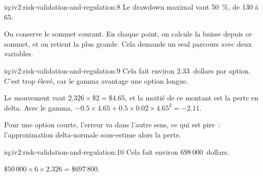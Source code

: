 \begin{solution}{iq:iv2:risk-validation-and-regulation:8}
Le drawdown maximal vaut 50~\%, de 130 à 65.

On conserve le sommet courant. En chaque point, on calcule la baisse depuis ce sommet, et on retient la plus grande. Cela demande un seul parcours avec deux variables.

\end{solution}

\begin{solution}{iq:iv2:risk-validation-and-regulation:9}
Cela fait environ 2.33~dollars par option. C'est trop élevé, car le gamma avantage une option longue.

Le mouvement vaut $2.326 \times \$2 = \$4.65$, et la moitié de ce montant est la perte en delta. Avec le gamma, $-0.5 \times 4.65 + 0.5 \times 0.02 \times 4.65^2 = -2.11$.

Pour une option courte, l'erreur va dans l'autre sens, ce qui est pire~: l'approximation delta-normale sous-estime alors la perte.

\end{solution}

\begin{solution}{iq:iv2:risk-validation-and-regulation:10}
Cela fait environ 698\,000~dollars.

$\$50\,000 \times 6 \times 2.326 = \$697\,800$.

\end{solution}

